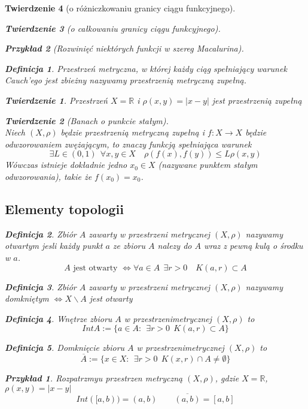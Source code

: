 \documentclass[12pt,a4paper]{article}
\newtheorem{tw}{Twierdzenie}
\newtheorem{przyklad}{Przykład}
\theoremstyle{definition}
\newtheorem{df}{Definicja}
\begin{document}
\begin{tw}[o różniczkowaniu granicy ciągu funkcyjnego]
\begin{tw}[o całkowaniu granicy ciągu funkcyjnego]
\begin{przyklad}[Rozwinięć niektórych funkcji w szereg Macalurina]
\begin{df}
Przestrzeń metryczna, w której każdy ciąg spełniający warunek Cauch'ego jest zbieżny nazywamy przestrzenią metryczną zupełną.
\end{df}

\begin{tw}
Przestrzeń $X = \mathbb{R}$ i $\rho (x,y) = |x-y|$ jest przestrzenią zupełną
\end{tw}

\begin{tw}[Banach o punkcie stałym]~\\
Niech $(X, \rho)$ będzie przestrzenią metryczną zupełną i $f: X \to X$ będzie odwzorowaniem zwężającym, to znaczy funkcją spełniająca warunek
$$ \exists L\in (0,1) ~~ \forall x,y\in X \quad \rho (f(x), f(y)) \leqslant L\rho (x, y) $$
Wówczas istnieje dokładnie jedno $x_0 \in X$ (nazywane punktem stałym odwzorowania), takie że $f(x_0) = x_0$. 
\end{tw}


\subsection{Elementy topologii}
\begin{df}
Zbiór $A$ zawarty w przestrzeni metrycznej $(X, \rho)$ nazywamy otwartym jesli każdy punkt $a$ ze zbioru $A$ nalezy do $A$ wraz z pewną kulą o środku w $a$.\\
$$A \mbox{ jest otwarty } \Leftrightarrow \forall a\in A ~~ \exists r>0 \quad K(a, r) \subset A$$
\end{df}
\begin{df}
Zbiór $A$ zawarty w przestrzeni metrycznej $(X, \rho)$ nazywamy domkniętym $ \Leftrightarrow X \smallsetminus A$ jest otwarty
\end{df}

\begin{df}
Wnętrze zbioru $A$ w przestrzenimetrycznej $(X, \rho)$ to 
$$ IntA := \{a\in A: ~~ \exists r>0 ~~ K(a,r) \subset A \} $$
\end{df}
\begin{df}
Domknięcie zbioru $A$ w przestrzenimetrycznej $(X, \rho)$ to 
$$ \overline{A} := \{x\in X: ~~ \exists r>0 ~~ K(x,r) \cap A \neq \emptyset \} $$
\end{df}

\begin{przyklad}
Rozpatrzmyu przestrzen metryczną $(X, \rho)$, gdzie $X = \mathbb{R}$, $\rho (x,y) = |x-y|$\\
$$Int([a,b)) = (a,b) \quad\quad \overline{(a,b)} = [a,b]$$
\end{przyklad}




\end{przyklad}
\end{tw}
\end{tw}
\end{document}
